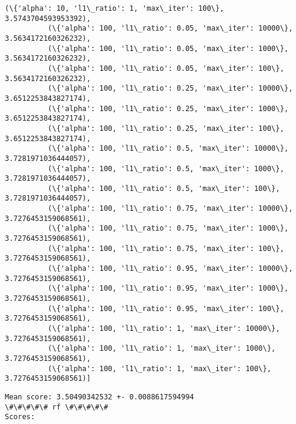 \documentclass[11pt]{article}
\begin{document}
\begin{Verbatim}[commandchars=\\\{\}]
          (\{'alpha': 10, 'l1\_ratio': 1, 'max\_iter': 100\}, 3.5743704593953392),
          (\{'alpha': 100, 'l1\_ratio': 0.05, 'max\_iter': 10000\}, 3.5634172160326232),
          (\{'alpha': 100, 'l1\_ratio': 0.05, 'max\_iter': 1000\}, 3.5634172160326232),
          (\{'alpha': 100, 'l1\_ratio': 0.05, 'max\_iter': 100\}, 3.5634172160326232),
          (\{'alpha': 100, 'l1\_ratio': 0.25, 'max\_iter': 10000\}, 3.6512253843827174),
          (\{'alpha': 100, 'l1\_ratio': 0.25, 'max\_iter': 1000\}, 3.6512253843827174),
          (\{'alpha': 100, 'l1\_ratio': 0.25, 'max\_iter': 100\}, 3.6512253843827174),
          (\{'alpha': 100, 'l1\_ratio': 0.5, 'max\_iter': 10000\}, 3.7281971036444057),
          (\{'alpha': 100, 'l1\_ratio': 0.5, 'max\_iter': 1000\}, 3.7281971036444057),
          (\{'alpha': 100, 'l1\_ratio': 0.5, 'max\_iter': 100\}, 3.7281971036444057),
          (\{'alpha': 100, 'l1\_ratio': 0.75, 'max\_iter': 10000\}, 3.7276453159068561),
          (\{'alpha': 100, 'l1\_ratio': 0.75, 'max\_iter': 1000\}, 3.7276453159068561),
          (\{'alpha': 100, 'l1\_ratio': 0.75, 'max\_iter': 100\}, 3.7276453159068561),
          (\{'alpha': 100, 'l1\_ratio': 0.95, 'max\_iter': 10000\}, 3.7276453159068561),
          (\{'alpha': 100, 'l1\_ratio': 0.95, 'max\_iter': 1000\}, 3.7276453159068561),
          (\{'alpha': 100, 'l1\_ratio': 0.95, 'max\_iter': 100\}, 3.7276453159068561),
          (\{'alpha': 100, 'l1\_ratio': 1, 'max\_iter': 10000\}, 3.7276453159068561),
          (\{'alpha': 100, 'l1\_ratio': 1, 'max\_iter': 1000\}, 3.7276453159068561),
          (\{'alpha': 100, 'l1\_ratio': 1, 'max\_iter': 100\}, 3.7276453159068561)]
\end{Verbatim}
        
    \begin{Verbatim}[commandchars=\\\{\}]
Mean score: 3.50490342532 +- 0.0088617594994
\#\#\#\#\# rf \#\#\#\#\#
Scores:

    \end{Verbatim}
\end{document}
